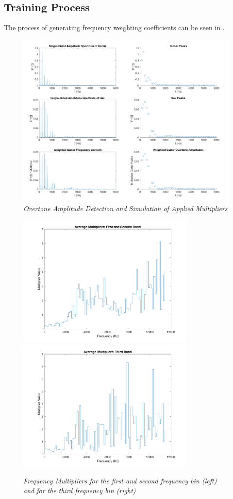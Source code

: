 \documentclass[twoside,a4paper]{article}
\begin{document}
\subsection{Training Process}
The process of generating frequency weighting coefficients can be seen in .

\begin{figure}[htpb]
  \center
  \includegraphics[width=7in]{Pictures/FreqPlot1.png}
  \caption{\label{freq1} {\it Overtone Amplitude Detection and Simulation of Applied Multipliers}}
  \end{figure}

\begin{figure}[ht]
  \includegraphics[width=3.5in]{Pictures/FreqMult1_2.png}
  \includegraphics[width=3.5in]{Pictures/FreqMult3.png}
  \caption{\label{freq2} {\it Frequency Multipliers for the first and second frequency bin (left) and for the third frequency bin (right)}}
  \centering
  \end{figure}
\end{document}
